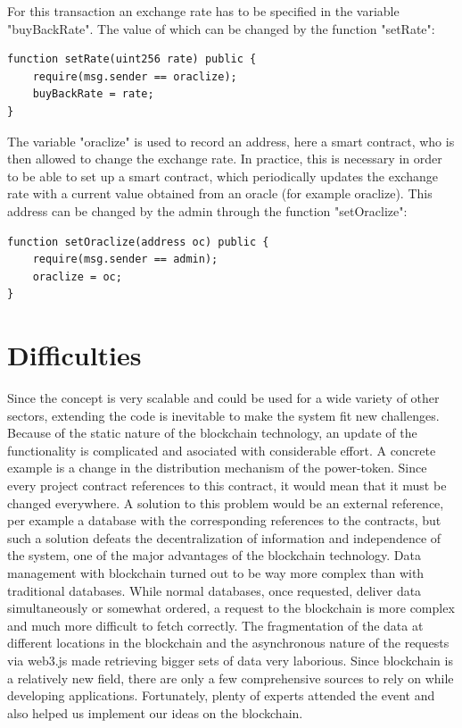 For this transaction an exchange rate has to be specified in the variable "buyBackRate". The value of which can be changed by the function "setRate":

\begin{lstlisting}[language=Solidity, firstnumber=22]
function setRate(uint256 rate) public {
    require(msg.sender == oraclize);
    buyBackRate = rate;
}
\end{lstlisting}

The variable "oraclize" is used to record an address, here a smart contract, who is then allowed to change the exchange rate. In practice, this is necessary in order to be able to set up a smart contract, which periodically updates the exchange rate with a current value obtained from an oracle (for example oraclize). This address can be changed by the admin through the function "setOraclize":

\begin{lstlisting}[language=Solidity, firstnumber=27]
function setOraclize(address oc) public {
    require(msg.sender == admin);
    oraclize = oc;
}
\end{lstlisting}


\section{Difficulties}
Since the concept is very scalable and could be used for a wide variety of other sectors, extending the code is inevitable to make the system fit new challenges. Because of the static nature of the blockchain technology, an update of the functionality is complicated and asociated with considerable effort. A concrete example is a change in the distribution mechanism of the power-token. Since every project contract references to this contract, it would mean that it must be changed everywhere. A solution to this problem would be an external reference, per example a database with the corresponding references to the contracts, but such a solution defeats the decentralization of information and independence of the system, one of the major advantages of the blockchain technology.
Data management with blockchain turned out to be way more complex than with traditional databases. While normal databases, once requested, deliver data simultaneously or somewhat ordered, a request to the blockchain is more complex and much more difficult to fetch correctly. The fragmentation of the data at different locations in the blockchain and the asynchronous nature of the requests via web3.js made retrieving bigger sets of data very laborious.
Since blockchain is a relatively new field, there are only a few comprehensive sources to rely on while developing applications. Fortunately, plenty of experts attended the event and also helped us implement our ideas on the blockchain.


